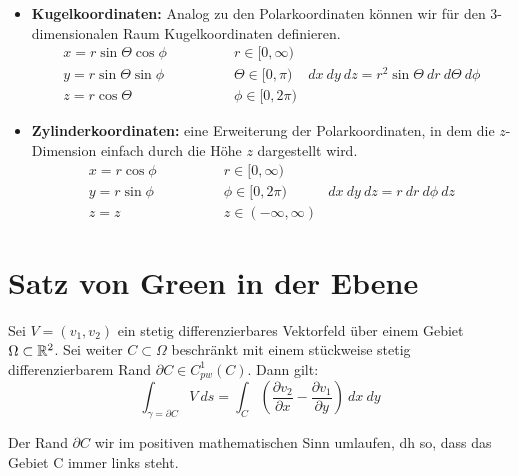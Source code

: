 \begin{concept}[Koordinatentransformationen in $\R^3$]
    \begin{itemize}
        \item \textbf{Kugelkoordinaten:} Analog zu den Polarkoordinaten können wir für den 3-dimensionalen Raum Kugelkoordinaten definieren.
        \begin{align*}
             x = r \sin \Theta \cos \phi \quad \quad \quad \quad & r \in [0, \infty) &  \\
             y = r \sin \Theta \sin \phi \quad \quad \quad \quad  & \Theta \in [0,\pi) & dx\: dy\: dz = r^2 \sin \Theta \: dr \: d\Theta \: d\phi \\
             z = r \cos \Theta \quad \quad \quad \quad & \phi \in [0, 2\pi) &
        \end{align*}
        \item \textbf{Zylinderkoordinaten:} eine Erweiterung der Polarkoordinaten, in dem die $z$-Dimension einfach durch die Höhe $z$ dargestellt wird.
        \begin{align*}
             x = r \cos \phi \quad \quad \quad \quad & r \in [0, \infty) & \\
             y = r \sin \phi \quad \quad \quad \quad  & \phi \in [0, 2\pi) & dx\: dy \: dz =  r \: dr \: d\phi \: dz\\ 
             z = z \quad \quad \quad \quad & z \in (- \infty, \infty) & 
        \end{align*}
    \end{itemize}
\end{concept}

\section{Satz von Green in der Ebene}

\begin{theorem}
    Sei $V=(v_1, v_2)$ ein stetig differenzierbares Vektorfeld über einem Gebiet $\Omega \subset\mathbb{R}^2$. Sei weiter $C \subset \Omega$ beschränkt mit einem stückweise stetig differenzierbarem Rand $\partial C \in C_{\mathit{pw}}^1(C)$. Dann gilt:
    $$ \int_{\gamma = \partial C} V \: ds = \int_C \left(\frac{\partial v_2}{\partial x} - \frac{\partial v_1}{\partial y} \right) \: dx \: dy$$
\end{theorem}

\begin{remark}
    Der Rand $\partial C$ wir im positiven mathematischen Sinn umlaufen, dh so, dass das Gebiet C immer links steht.
\end{remark}

